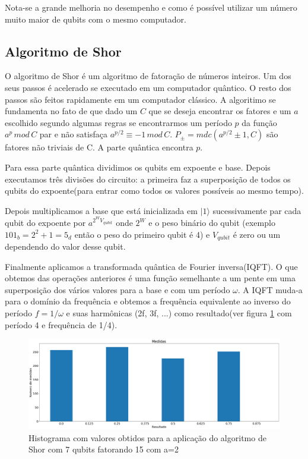 \documentclass[12pt,a4paper]{article}
\begin{document}
Nota-se a grande melhoria no desempenho e como é possível utilizar um número muito maior de qubits com o mesmo computador.

\subsection{Algoritmo de Shor}
 O algoritmo de Shor é um algoritmo de fatoração de números inteiros. Um dos seus passos é acelerado se executado em um computador quântico.  O resto dos passos são feitos rapidamente em um computador clássico. A algoritimo se fundamenta no fato de que dado um $C$ que se deseja encontrar os fatores e um $a$ escolhido segundo algumas regras se encontrarmos um período $p$ da função $a^p \, mod \, C$ par e não satisfaça $a^{p/2} \equiv -1\, mod\, C$. $P_{\pm} = mdc( a^{p/2} \pm 1, C)$ são fatores não triviais de C. A parte quântica encontra $p$. 
 
 Para essa parte quântica dividimos os qubits em expoente e base. Depois executamos três divisões do circuito: a primeira faz a superposição de todos os qubits do expoente(para entrar como todos os valores possíveis ao mesmo tempo).
 
 Depois multiplicamos a base que está inicializada em $|1\rangle$ sucessivamente par cada qubit do expoente por $a^{2^W V_{qubit}} $ onde $2^W$ e o peso binário do qubit (exemplo $101_b=2^2+1=5_d$ então o peso do primeiro qubit é 4) e $V_{qubit}$ é zero ou um dependendo do valor desse qubit.
 
 Finalmente aplicamos a transformada quântica de Fourier inversa(IQFT). O que obtemos das operações anteriores é uma função semelhante a um pente em uma superposição dos vários valores para a base e com um período $\omega$. A IQFT muda-a para o domínio da frequência e obtemos a frequência equivalente ao inverso do período $f=1/\omega$ e suas harmônicas (2f, 3f, ...) como resultado(ver figura \ref{fig:Shor1} com período 4 e frequência de 1/4).  \cite{Candela2015UndergraduateComputing}
 
\begin{figure}
    \centering
    \includegraphics[width=1\textwidth]{relatorio-shor1.png}
    \caption{Histograma com valores obtidos para a aplicação do algoritmo de Shor com 7 qubits fatorando 15 com a=2}
    \label{fig:Shor1}
\end{figure}
\end{document}

